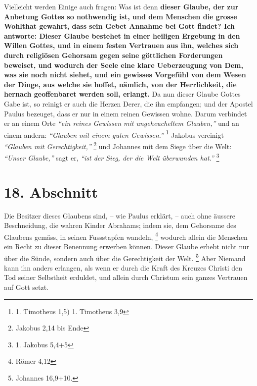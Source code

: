 Vielleicht werden Einige auch fragen: Was ist denn \textbf{dieser Glaube, der
zur
Anbetung Gottes so nothwendig ist, und dem Menschen die grosse Wohlthat gewahrt,
dass sein Gebet Annahme bei Gott findet? Ich antworte: Dieser Glaube bestehet in
einer heiligen Ergebung in den Willen Gottes, und in einem festen Vertrauen aus 
ihn, welches sich durch religiösen Gehorsam gegen
seine göttlichen Forderungen
beweiset, und wodurch der Seele eine klare Ueberzeugung von Dem, was sie noch
nicht siehet, und ein gewisses Vorgefühl von dem Wesen der Dinge, aus welche sie
hoffet, nämlich, von der Herrlichkeit, die hernach geoffenbaret werden soll,
erlangt.} Da nun dieser Glaube Gottes Gabe ist, so reinigt er auch die Herzen
Derer, die ihn empfangen; und der Apostel Paulus bezeuget, dass er nur in einem
reinen Gewissen wohne. Darum verbindet er an einem Orte
\textit{"`ein reines Gewissen mit ungeheucheltem Glauben,"'} und an einem
andern: \textit{"`Glauben mit einem guten
Gewissen."'}
\footnote{1. Timotheus 1,5) 1. Timotheus 3,9}
Jakobus vereinigt
\textit{"`Glauben mit Gerechtigkeit,"'}
\footnote{Jakobus 2,14 bis Ende}
und Johannes mit dem Siege über
die Welt:\textit{ "`Unser Glaube,"'} sagt er, \textit{"`ist der Sieg, der die
Welt überwunden hat."'} 
\footnote{1. Jakobus 5,4+5}

\section{18. Abschnitt} \label{kap6_ab18}

Die Besitzer dieses Glaubens sind, -- wie Paulus erklärt, -- auch ohne äussere
Beschneidung, die wahren Kinder
Abrahams; indem sie, dem Gehorsame des Glaubens
gemäss, in seinen Fussstapfen wandeln,
\footnote{Römer 4,12}
wodurch allein die
Menschen ein Recht zu dieser Benennung erwerben können. Dieser Glaube erhebt
nicht nur über die Sünde, sondern auch über die
Gerechtigkeit der Welt.
\footnote{Johannes 16,9+10.}
Aber Niemand kann ihn anders erlangen, als wenn
er durch die Kraft des Kreuzes Christi den Tod seiner Selbstheit erduldet, und
allein durch Christum sein ganzes Vertrauen auf Gott setzt.

